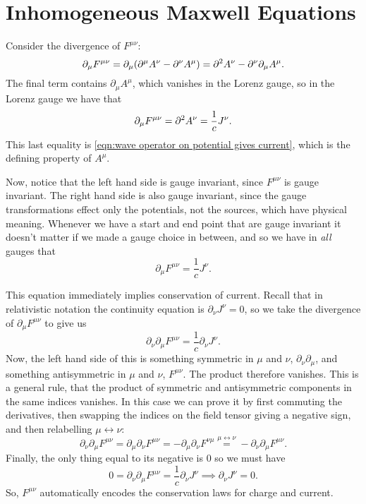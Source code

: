 \section{Inhomogeneous Maxwell Equations}
Consider the divergence of \(F^{\mu\nu}\):
\begin{equation}
    \partial_{\mu}F^{\mu\nu} = \partial_\mu(\partial^\mu A^\nu - \partial^\nu A^\mu) = \partial^2 A^\nu - \partial^\nu \partial_\mu A^\mu.
\end{equation}
The final term contains \(\partial_\mu A^\mu\), which vanishes in the Lorenz gauge, so in the Lorenz gauge we have that
\begin{equation}
    \partial_\mu F^{\mu\nu} = \partial^2 A^\nu = \frac{1}{c}J^\nu.
\end{equation}
This last equality is \cref{eqn:wave operator on potential gives current}, which is the defining property of \(A^\mu\).

Now, notice that the left hand side is gauge invariant, since \(F^{\mu\nu}\) is gauge invariant.
The right hand side is also gauge invariant, since the gauge transformations effect only the potentials, not the sources, which have physical meaning.
Whenever we have a start and end point that are gauge invariant it doesn't matter if we made a gauge choice in between, and so we have in \emph{all} gauges that
\begin{equation}
    \partial_\mu F^{\mu\nu} = \frac{1}{c}J^\nu.
\end{equation}

This equation immediately implies conservation of current.
Recall that in relativistic notation the continuity equation is \(\partial_\nu J^\nu = 0\), so we take the divergence of \(\partial_\mu F^{\mu\nu}\) to give us
\begin{equation}
    \partial_\nu \partial_\mu F^{\mu\nu} = \frac{1}{c}\partial_\nu J^\nu.
\end{equation}
Now, the left hand side of this is something symmetric in \(\mu\) and \(\nu\), \(\partial_\nu \partial_\mu\), and something antisymmetric in \(\mu\) and \(\nu\), \(F^{\mu\nu}\).
The product therefore vanishes.
This is a general rule, that the product of symmetric and antisymmetric components in the same indices vanishes.
In this case we can prove it by first commuting the derivatives, then swapping the indices on the field tensor giving a negative sign, and then relabelling \(\mu \leftrightarrow \nu\):
\begin{equation}
    \partial_\nu \partial_\mu F^{\mu\nu} = \partial_\mu \partial_\nu F^{\mu\nu} = -\partial_\mu \partial_\nu F^{\nu\mu} \stackrel{\mu \leftrightarrow \nu}{=} -\partial_\nu \partial_\mu F^{\mu\nu}.
\end{equation}
Finally, the only thing equal to its negative is \(0\) so we must have
\begin{equation}
    0 = \partial_\nu \partial_\mu F^{\mu\nu} = \frac{1}{c}\partial_\nu J^\nu \implies \partial_\nu J^\nu = 0.
\end{equation}
So, \(F^{\mu\nu}\) automatically encodes the conservation laws for charge and current.


